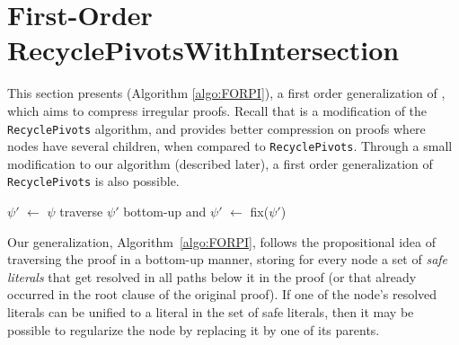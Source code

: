 \section{First-Order RecyclePivotsWithIntersection}
\label{sec:FORPI}
This section presents {\FORPI} (Algorithm \ref{algo:FORPI}), a first order generalization of {\RecyclePivotsIntersection}, which aims to compress irregular proofs. Recall that \RecyclePivotsIntersection
is a modification of the \texttt{RecyclePivots} algorithm, %
and \RecyclePivotsIntersection provides better compression on proofs where nodes have several children, when compared to \texttt{RecyclePivots}. Through a small modification to our algorithm (described later), a first order generalization of \texttt{RecyclePivots} is also possible.


\newcommand{\la}{\leftarrow}


\begin{algorithm}[!b]
\begin{footnotesize}


\BlankLine

$\psi'$ $\la$ $\psi$\;
traverse $\psi'$ bottom-up and 
$\psi'$ $\la$ fix($\psi'$) \;
\;
\caption{\label{algo:FORPI} \texttt{\FORPI}}
\end{footnotesize}
\end{algorithm}



Our generalization, Algorithm~\ref{algo:FORPI}, follows the propositional idea of traversing the proof in a bottom-up manner, storing for every node a set of \emph{safe literals} that get resolved in all paths below it in the proof (or that already occurred in the root clause of the original proof). If one of the node's resolved literals can be unified to a literal in the set of safe literals, then it may be possible to regularize the node by replacing it by one of its parents. 

